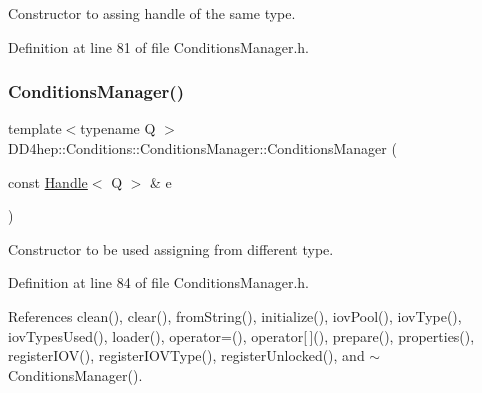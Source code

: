 Constructor to assing handle of the same type. 



Definition at line 81 of file Conditions\+Manager.\+h.

\hypertarget{class_d_d4hep_1_1_conditions_1_1_conditions_manager_a8557429632d8e39c4fdcebbee00e2457}{}\label{class_d_d4hep_1_1_conditions_1_1_conditions_manager_a8557429632d8e39c4fdcebbee00e2457} 
\subsubsection{\texorpdfstring{Conditions\+Manager()}{ConditionsManager()}\hspace{0.1cm}{\footnotesize\ttfamily [5/5]}}
{\footnotesize\ttfamily template$<$typename Q $>$ \\
D\+D4hep\+::\+Conditions\+::\+Conditions\+Manager\+::\+Conditions\+Manager (\begin{DoxyParamCaption}\item[{const \hyperlink{class_d_d4hep_1_1_handle}{Handle}$<$ Q $>$ \&}]{e }\end{DoxyParamCaption})\hspace{0.3cm}{\ttfamily [inline]}}



Constructor to be used assigning from different type. 



Definition at line 84 of file Conditions\+Manager.\+h.



References clean(), clear(), from\+String(), initialize(), iov\+Pool(), iov\+Type(), iov\+Types\+Used(), loader(), operator=(), operator\mbox{[}$\,$\mbox{]}(), prepare(), properties(), register\+I\+O\+V(), register\+I\+O\+V\+Type(), register\+Unlocked(), and $\sim$\+Conditions\+Manager().

\hypertarget{class_d_d4hep_1_1_conditions_1_1_conditions_manager_a165b25f83b4da883427e061966b5ee3d}{}\label{class_d_d4hep_1_1_conditions_1_1_conditions_manager_a165b25f83b4da883427e061966b5ee3d} 
